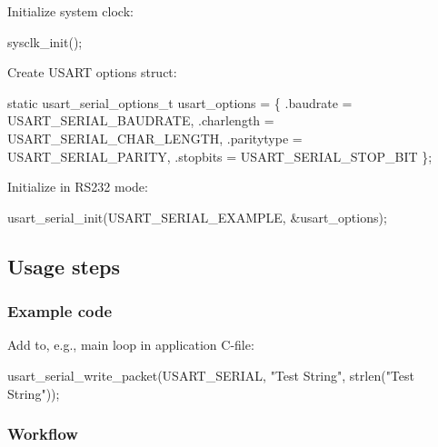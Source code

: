 \begin{DoxyEnumerate}
\item Initialize system clock\+:
\begin{DoxyItemize}
\item 
\begin{DoxyCode}
sysclk\_init(); 
\end{DoxyCode}

\end{DoxyItemize}
\item Create U\+S\+A\+R\+T options struct\+:
\begin{DoxyItemize}
\item 
\begin{DoxyCode}
\textcolor{keyword}{static} usart\_serial\_options\_t usart\_options = \{
   .baudrate = USART\_SERIAL\_BAUDRATE,
   .charlength = USART\_SERIAL\_CHAR\_LENGTH,
   .paritytype = USART\_SERIAL\_PARITY,
   .stopbits = USART\_SERIAL\_STOP\_BIT
\};
\end{DoxyCode}

\end{DoxyItemize}
\item Initialize in R\+S232 mode\+:
\begin{DoxyItemize}
\item 
\begin{DoxyCode}
usart\_serial\_init(USART\_SERIAL\_EXAMPLE, &usart\_options); 
\end{DoxyCode}

\end{DoxyItemize}
\end{DoxyEnumerate}\hypertarget{serial_use_case_1_serial_use_case_1_usage}{}\subsection{Usage steps}\label{serial_use_case_1_serial_use_case_1_usage}
\hypertarget{serial_use_case_1_serial_use_case_1_usage_code}{}\subsubsection{Example code}\label{serial_use_case_1_serial_use_case_1_usage_code}
Add to, e.\+g., main loop in application C-\/file\+: 
\begin{DoxyCode}
usart\_serial\_write\_packet(USART\_SERIAL, \textcolor{stringliteral}{"Test String"}, strlen(\textcolor{stringliteral}{"Test String"}));
\end{DoxyCode}
\hypertarget{serial_use_case_1_serial_use_case_1_usage_flow}{}\subsubsection{Workflow}\label{serial_use_case_1_serial_use_case_1_usage_flow}

